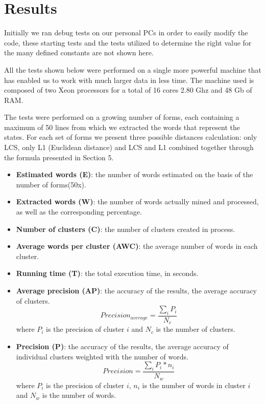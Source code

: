 \section{Results}

Initially we ran debug tests on our personal PCs in order to easily modify the code, these starting tests and the tests utilized to determine the right value for the many defined constants are not shown here. 

All the tests shown below were performed on a single more powerful machine that has enabled us to work with much larger data in less time. The machine used is composed of two Xeon processors for a total of 16 cores 2.80 Ghz and 48 Gb of RAM.

The tests were performed on a growing number of forms, each containing a maximum of 50 lines from which we extracted the words that represent the states. For each set of forms we present three possible distances calculation: only LCS, only L1 (Euclidean distance) and LCS and L1 combined together through the formula presented in Section 5.

\vspace{3mm}

\begin{itemize}
\item \textbf{Estimated words (E)}: the number of words estimated on the basis of the number of forms(50x).
\item \textbf{Extracted words (W)}: the number of words actually mined and processed, as well as the corresponding percentage.
\item \textbf{Number of clusters (C)}: the number of clusters created in process.
\item \textbf{Average words per cluster (AWC)}: the average number of words in each cluster.
\item \textbf{Running time (T)}: the total execution time, in seconds.
\item \textbf{Average precision (AP)}: the accuracy of the results, the average accuracy of clusters.
$$Precision_{average} = \frac{\sum_i P_i}{N_c}$$
where $P_i$ is the precision of cluster $i$ and $N_c$ is the number of clusters. 
\item \textbf{Precision (P)}: the accuracy of the results, the average accuracy of individual clusters weighted with the number of words.
$$Precision = \frac{\sum_i P_i * n_i}{N_w}$$
where $P_i$ is the precision of cluster $i$, $n_i$ is the number of words in cluster $i$ and $N_w$ is the number of words. 
\end{itemize}

